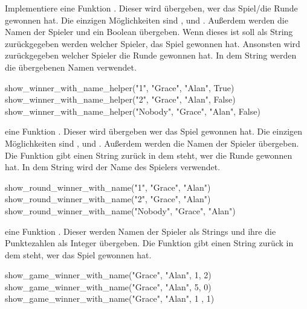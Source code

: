 \documentclass[a4paper, DIV = calc]{scrartcl}
\begin{document}
\begin{aufgabe}
Implementiere eine Funktion . Dieser wird übergeben, wer das Spiel/die Runde gewonnen hat. Die einzigen Möglichkeiten sind  ,  und . Außerdem werden die Namen der Spieler und ein Boolean übergeben. Wenn dieses  ist soll als String zurückgegeben werden welcher Spieler, das Spiel gewonnen hat. Ansonsten wird zurückgegeben welcher Spieler die Runde gewonnen hat. In dem String werden die übergebenen Namen verwendet.


\begin{pyconsole}
show_winner_with_name_helper("1", "Grace", "Alan", True)
show_winner_with_name_helper("2", "Grace", "Alan", False)
show_winner_with_name_helper("Nobody", "Grace", "Alan", False)
\end{pyconsole}



\end{aufgabe}

\begin{aufgabe}
eine Funktion . Dieser wird übergeben wer das Spiel gewonnen hat. Die einzigen Möglichkeiten sind  ,  und . Außerdem werden die Namen der Spieler übergeben. Die Funktion gibt einen String zurück in dem steht, wer die Runde gewonnen hat. In dem String wird der Name des Spielers verwendet.

\begin{pyconsole}
show_round_winner_with_name("1", "Grace", "Alan")
show_round_winner_with_name("2", "Grace", "Alan")
show_round_winner_with_name("Nobody", "Grace", "Alan")
\end{pyconsole}

\end{aufgabe}

\begin{aufgabe}
eine Funktion . Dieser werden Namen der Spieler als Strings und ihre die Punktezahlen  als Integer  übergeben. Die Funktion gibt einen String zurück in dem steht, wer das Spiel gewonnen hat.

\begin{pyconsole}
show_game_winner_with_name("Grace", "Alan", 1, 2)
show_game_winner_with_name("Grace", "Alan", 5, 0)
show_game_winner_with_name("Grace", "Alan", 1 , 1)
\end{pyconsole}

\end{aufgabe}
\end{document}
